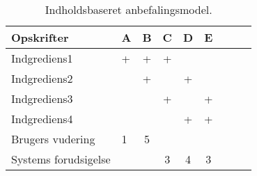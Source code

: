\begin{table}[H]
  \centering
      \begin{tabular}{l|lccccccc}
      \textbf{Opskrifter}   & A        & B       & C       & D       & E   \\ \hline
      Indgrediens1          & +        & +       & +       &         &     \\
      Indgrediens2          &          & +       &         & +       &     \\
      Indgrediens3          &          &         & +       &         & +   \\
      Indgrediens4  		    &          &         &         & +       & +   \\ \hline
      Brugers vudering      & 1        & 5       &         &         &     \\
      Systems forudsigelse  &          &         & 3       & 4       &  3  \\


    \end{tabular}
  \caption{Indholdsbaseret anbefalingsmodel.}\label{tabel:opskriftanbefaling}
\end{table}
